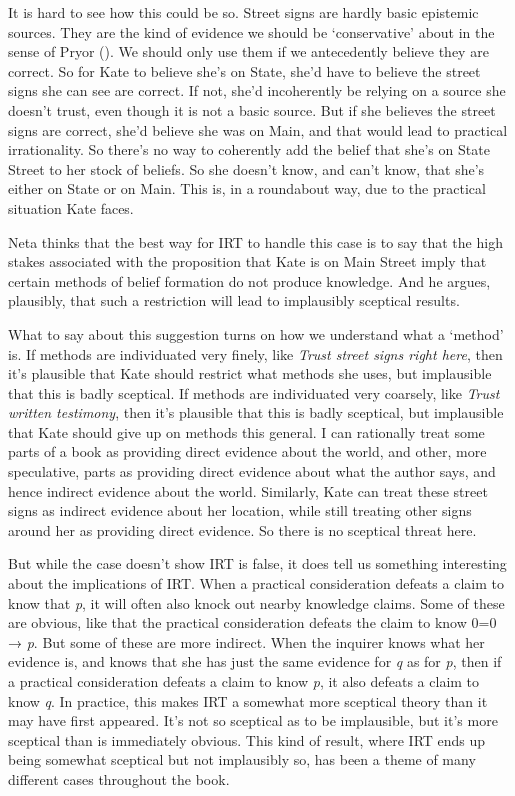 \documentclass[
  10pt,
  letterpaper,
  twoside]{scrbook}
\begin{document}
It is hard to see how this could be so. Street signs are hardly basic
epistemic sources. They are the kind of evidence we should be
`conservative' about in the sense of Pryor
(). We should only use them if we
antecedently believe they are correct. So for Kate to believe she's on
State, she'd have to believe the street signs she can see are correct.
If not, she'd incoherently be relying on a source she doesn't trust,
even though it is not a basic source. But if she believes the street
signs are correct, she'd believe she was on Main, and that would lead to
practical irrationality. So there's no way to coherently add the belief
that she's on State Street to her stock of beliefs. So she doesn't know,
and can't know, that she's either on State or on Main. This is, in a
roundabout way, due to the practical situation Kate faces.

Neta thinks that the best way for IRT to handle this case is to say that
the high stakes associated with the proposition that Kate is on Main
Street imply that certain methods of belief formation do not produce
knowledge. And he argues, plausibly, that such a restriction will lead
to implausibly sceptical results.

What to say about this suggestion turns on how we understand what a
`method' is. If methods are individuated very finely, like \emph{Trust
street signs right here}, then it's plausible that Kate should restrict
what methods she uses, but implausible that this is badly sceptical. If
methods are individuated very coarsely, like \emph{Trust written
testimony}, then it's plausible that this is badly sceptical, but
implausible that Kate should give up on methods this general. I can
rationally treat some parts of a book as providing direct evidence about
the world, and other, more speculative, parts as providing direct
evidence about what the author says, and hence indirect evidence about
the world. Similarly, Kate can treat these street signs as indirect
evidence about her location, while still treating other signs around her
as providing direct evidence. So there is no sceptical threat here.

But while the case doesn't show IRT is false, it does tell us something
interesting about the implications of IRT. When a practical
consideration defeats a claim to know that \emph{p}, it will often also
knock out nearby knowledge claims. Some of these are obvious, like that
the practical consideration defeats the claim to know 0=0 → \emph{p}.
But some of these are more indirect. When the inquirer knows what her
evidence is, and knows that she has just the same evidence for \emph{q}
as for \emph{p}, then if a practical consideration defeats a claim to
know \emph{p}, it also defeats a claim to know \emph{q}. In practice,
this makes IRT a somewhat more sceptical theory than it may have first
appeared. It's not so sceptical as to be implausible, but it's more
sceptical than is immediately obvious. This kind of result, where IRT
ends up being somewhat sceptical but not implausibly so, has been a
theme of many different cases throughout the book.
\end{document}
